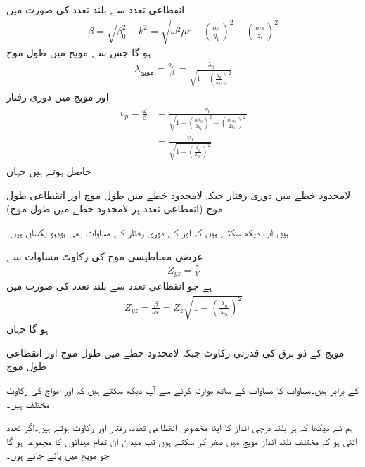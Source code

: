 انقطاعی تعدد سے بلند تعدد  کی صورت میں
\begin{align}
\beta=\sqrt{\beta_0^2-k^2}=\sqrt{\omega^2 \mu \epsilon-\left(\frac{n\pi}{y_1}\right)^2-\left(\frac{m\pi}{z_1}\right)^2}
\end{align}
ہو گا جس سے مویج میں طول موج
\begin{align}
\lambda_{\text{مویج}}=\frac{2\pi}{\beta}=\frac{\lambda_0}{\sqrt{1-\left(\frac{\lambda_0}{\lambda_{0c}}\right)^2}}
\end{align}
اور مویج میں  دوری رفتار
\begin{gather}
\begin{aligned}
v_p=\frac{\omega}{\beta}&=\frac{v_0}{\sqrt{1-\left(\frac{n\lambda_0}{2y_1}\right)^2-\left(\frac{m\lambda_0}{2z_1}\right)^2}}\\
&=\frac{v_0}{\sqrt{1-\left(\frac{\lambda_0}{\lambda_{0c}}\right)^2}}
\end{aligned}
\end{gather}
حاصل ہوتے ہیں جہاں
\begin{description}
 لامحدود خطے میں دوری رفتار  جبکہ 
 لامحدود خطے میں طول موج اور
 انقطاعی طول موج (انقطاعی تعدد پر لامحدود خطے میں طول موج)
\end{description}
ہیں۔آپ دیکھ سکتے ہیں کہ  اور  کے دوری رفتار کے مساوات بھی ہوبہو یکساں ہیں۔

عرضی مقناطیسی موج کی رکاوٹ مساوات  سے 
\begin{align*}
Z_{yz}=\frac{\gamma}{Y}
\end{align*}
ہے جو انقطاعی تعدد سے بلند تعدد  کی صورت میں
\begin{align}\label{مساوات_مویج_عرضی_مقناطیسی_رکاوٹ_حتمی}
Z_{yz}=\frac{\beta}{\omega \epsilon}=Z_z \sqrt{1-\left(\frac{\lambda_0}{\lambda_{0c}}\right)^2}
\end{align}
ہو گا جہاں
\begin{description}
 مویج کے ذو برق کی قدرتی رکاوٹ  جبکہ 
 لامحدود خطے میں طول موج اور
 انقطاعی طول موج
\end{description}
کے برابر ہیں۔مساوات  کا مساوات  کے ساتھ موازنہ کرنے سے آپ دیکھ سکتے ہیں کہ  اور  امواج کی رکاوٹ مختلف ہیں۔

ہم نے دیکھا کہ ہر بلند درجی انداز کا اپنا مخصوص انقطاعی تعدد، رفتار اور رکاوٹ ہوتے ہیں۔اگر تعدد اتنی ہو کہ مختلف بلند انداز مویج میں صفر کر سکتے ہوں تب میدان ان تمام میدانوں کا مجموعہ ہو گا جو مویج میں پائے جاتے ہوں۔ 

